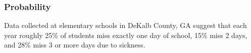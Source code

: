\documentclass[12pt]{exam}
\newcounter{countA}
\begin{document}
\subsubsection*{Probability}\label{probability}
\begin{questions}
\setcounter{question}{\value{countA}}
%
%
\question
  Data collected at elementary schools in DeKalb County, GA suggest that
  each year roughly 25\% of students miss exactly one day of school,
  15\% miss 2 days, and 28\% miss 3 or more days due to sickness.


\end{questions}
\end{document}
